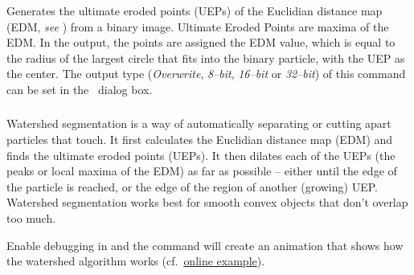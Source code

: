 \subsubsection[\protect\userinterface{Ultimate Points}]{\protect{}\label{sub:Ultimate-Points}}

Generates the ultimate eroded points (UEPs)
of the Euclidian distance map (EDM, \emph{see} )
from a binary image. Ultimate Eroded Points are maxima of the EDM.
In the output, the points are assigned the EDM value, which is equal
to the radius of the largest circle that fits into the binary particle,
with the UEP as the center. The output type (\emph{Overwrite}, \emph{8--bit},
\emph{16--bit} or \emph{32--bit}) of this command can be set in the
\ dialog
box.


\subsubsection{\protect{}\label{sub:Watershed}}

Watershed segmentation is a way of automatically
separating or cutting apart particles that touch. It first calculates
the Euclidian distance map (EDM) and
finds the ultimate eroded points (UEPs). It then dilates each of the
UEPs (the peaks or local maxima of the EDM) as far as possible --
either until the edge of the particle is reached, or the edge of the
region of another (growing) UEP. Watershed segmentation works best
for smooth convex objects that don't overlap too much.

Enable debugging in 
and the  command will create an animation
that shows how the watershed algorithm works (cf.\ \href{http://imagej.nih.gov/ij/images/watershed-animation.gif}{online example}).




